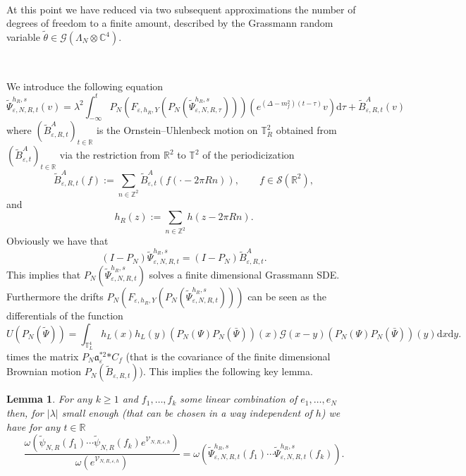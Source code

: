 \documentclass{article}
\newcommand{\assign}{:=}
\newcommand{\asterisk}{\mathord{*}}
\newcommand{\mathd}{\mathrm{d}}
\newtheorem{lemma}[theorem]{Lemma}
\begin{document}
\

At this point we have reduced via two subsequent approximations the number of
degrees of freedom to a finite amount, described by the Grassmann random
variable $\tilde{\theta} \in \mathcal{G} (\Lambda_N \otimes \mathbb{C}^4)$.

\

We introduce the following equation
\begin{equation}
  \tilde{\Psi}^{h_R, s}_{\varepsilon, N, R, t} (v) = \lambda^2 \int_{-
  \infty}^t P_N (F_{\varepsilon, h_R, Y} (P_N (\tilde{\Psi}_{\varepsilon, N,
  R, \tau}^{h_R, s}))) (e^{(\Delta - m^2_f) (t - \tau)} v) \mathd \tau +
  \tilde{B}_{\varepsilon, R, t}^A (v) \label{eq:finitedimensional}
\end{equation}
where $(\tilde{B}_{\varepsilon, R, t}^A)_{t \in \mathbb{R}}$ is the
Ornstein--Uhlenbeck motion on $\mathbb{T}^2_R$ obtained from
$(\tilde{B}_{\varepsilon, t}^A)_{t \in \mathbb{R}}$ via the restriction from
$\mathbb{R}^2$ to $\mathbb{T}^2$ of the periodicization
\[ \tilde{B}_{\varepsilon, R, t}^A (f) \assign \sum_{n \in \mathbb{Z}^2}
   \tilde{B}_{\varepsilon, t}^A (f (\cdot - 2 \pi R n)), \qquad f \in
   \mathcal{S} (\mathbb{R}^2), \]
and
\[ h_R (z) \assign \sum_{n \in \mathbb{Z}^2} h (z - 2 \pi R n) . \]
Obviously we have that
\[ (I - P_N) \tilde{\Psi}_{\varepsilon, N, R, t}^{h_R, s} = (I - P_N)
   \tilde{B}^A_{\varepsilon, R, t} . \]
This implies that $P_N (\tilde{\Psi}_{\varepsilon, N, R, t}^{h_R, s})$ solves
a finite dimensional Grassmann SDE. Furthermore the drifts $P_N
(F_{\varepsilon, h_R, Y} (P_N (\tilde{\Psi}_{\varepsilon, N, R, t}^{h_R,
s})))$ can be seen as the differentials of the function
\[ U (P_N (\tilde{\Psi})) = \int_{\mathbb{T}_L^4} h_L (x) h_L (y) (P_N (\Psi)
   P_N (\bar{\Psi})) (x) \mathcal{G} (x - y) (P_N (\Psi) P_N (\bar{\Psi})) (y)
   \mathd x \mathd y. \]
times the matrix $P_N \mathfrak{a}_{\varepsilon}^{\asterisk 2} \asterisk C_f$
(that is the covariance of the finite dimensional Brownian motion $P_N
(\tilde{B}_{\varepsilon, R, t})$). This implies the following key lemma.

\begin{lemma}
  \label{lemma_finite1}For any $k \geqslant 1$ and $f_1, \ldots, f_k$ some
  linear combination of $e_1, \ldots, e_N$ then, for $| \lambda |$ small
  enough (that can be chosen in a way independent of $h$) we have for any $t
  \in \mathbb{R}$
  \[ \frac{\omega (\tilde{\psi}_{N, R} (f_1) \cdots \tilde{\psi}_{N, R} (f_k)
     e^{\mathcal{V}_{N, R, \varepsilon, h}})}{\omega (e^{\mathcal{V}_{N, R,
     \varepsilon, h}})} = \omega (\tilde{\Psi}_{\varepsilon, N, R, t}^{h_R, s}
     (f_1) \cdots \tilde{\Psi}_{\varepsilon, N, R, t}^{h_R, s} (f_k)) . \]
  
\end{lemma}
\end{document}
